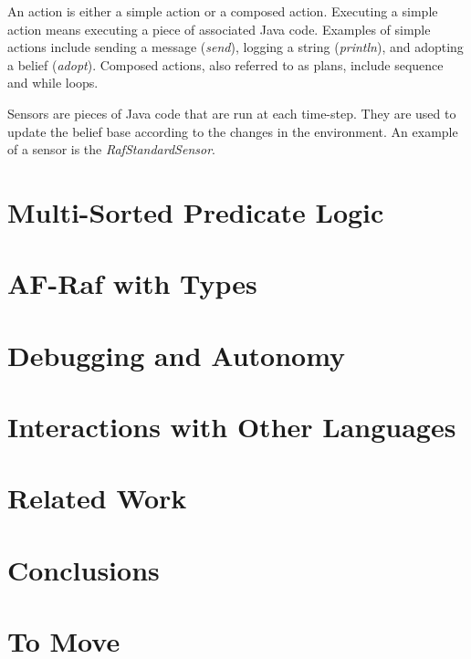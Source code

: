 \documentclass[preprint]{sigplanconf} %
\begin{document}
An action is either a simple action or a composed action. Executing a
simple action means executing a piece of associated Java code. Examples of
simple actions include sending a message (\textit{send}), logging a string
(\textit{println}), and adopting a belief (\textit{adopt}).  Composed
actions, also referred to as plans, include sequence and while loops.

Sensors are pieces of Java code that are run at each time-step. They are
used to update the belief base according to the changes in the environment.
An example of a sensor is the \textit{RafStandardSensor}.

\section{Multi-Sorted Predicate Logic} \label{sec:multi-sorted} %

\section{AF-Raf with Types} \label{sec:af-raf.types} %

\section{Debugging and Autonomy} \label{sec:bugs} %

\section{Interactions with Other Languages} \label{sec:unsorted} %

\section{Related Work} \label{sec:related} %

\section{Conclusions} \label{sec:conclusions} %

\section{To Move} %
\end{document}
